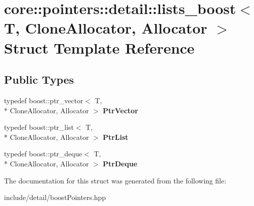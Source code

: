 \hypertarget{structcore_1_1pointers_1_1detail_1_1lists__boost}{\section{core\-:\-:pointers\-:\-:detail\-:\-:lists\-\_\-boost$<$ T, Clone\-Allocator, Allocator $>$ Struct Template Reference}
\label{structcore_1_1pointers_1_1detail_1_1lists__boost}
}
\subsection*{Public Types}
\begin{DoxyCompactItemize}
\item 
\hypertarget{structcore_1_1pointers_1_1detail_1_1lists__boost_acc2f05830af97a3b0f83e3abd492c32a}{typedef boost\-::ptr\-\_\-vector$<$ T, \\*
Clone\-Allocator, Allocator $>$ {\bfseries Ptr\-Vector}}\label{structcore_1_1pointers_1_1detail_1_1lists__boost_acc2f05830af97a3b0f83e3abd492c32a}

\item 
\hypertarget{structcore_1_1pointers_1_1detail_1_1lists__boost_a3f42f0a25a6bd5ffe0cf4ce0cbb39383}{typedef boost\-::ptr\-\_\-list$<$ T, \\*
Clone\-Allocator, Allocator $>$ {\bfseries Ptr\-List}}\label{structcore_1_1pointers_1_1detail_1_1lists__boost_a3f42f0a25a6bd5ffe0cf4ce0cbb39383}

\item 
\hypertarget{structcore_1_1pointers_1_1detail_1_1lists__boost_acacd193b39789ffa8fc5ec934c869ada}{typedef boost\-::ptr\-\_\-deque$<$ T, \\*
Clone\-Allocator, Allocator $>$ {\bfseries Ptr\-Deque}}\label{structcore_1_1pointers_1_1detail_1_1lists__boost_acacd193b39789ffa8fc5ec934c869ada}

\end{DoxyCompactItemize}


The documentation for this struct was generated from the following file\-:\begin{DoxyCompactItemize}
\item 
include/detail/boost\-Pointers.\-hpp\end{DoxyCompactItemize}
